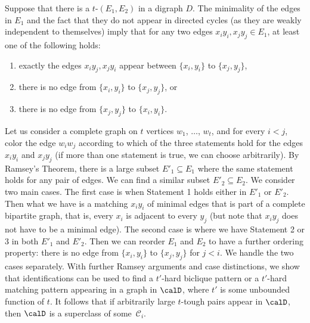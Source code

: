  Suppose that there is a $t$-\toughpair $(E_1,E_2)$ in a digraph $D$.  The minimality of the edges in $E_1$ and the fact that they do not appear in directed cycles (as they are weakly independent to themselves) imply that for any two edges $x_iy_i, x_jy_j\in E_1$, at least one of the following holds:
 \begin{enumerate}
   \item exactly the edges $x_iy_j, x_jy_i$ appear between $\{x_i,y_i\}$ to $\{x_j,y_j\}$,
   \item there is no edge from $\{x_i,y_i\}$ to $\{x_j,y_j\}$, or
   \item there is no edge from $\{x_j,y_j\}$ to $\{x_i,y_i\}$.
   \end{enumerate}
   Let us consider a complete graph on $t$ vertices $w_1$, $\dots$, $w_t$, and for every $i<j$, color the edge $w_iw_j$ according to which of the three statements hold for the edges $x_iy_i$ and $x_jy_j$ (if more than one statement is true, we can choose arbitrarily). By Ramsey's Theorem, there is a large subset $E'_1\subseteq E_1$ where the same statement holds for any pair of edges. We can find a similar subset $E'_2\subseteq E_2$. We consider two main cases. The first case is when Statement 1 holds either in $E'_1$ or $E'_2$. Then what we have is a matching $x_iy_i$ of minimal edges that is part of a complete bipartite graph, that is, every $x_i$ is adjacent to every $y_j$ (but note that $x_iy_j$ does not have to be a minimal edge). The second case is where we have Statement 2 or 3 in both $E'_1$ and $E'_2$. Then we can reorder $E_1$ and $E_2$ to have a further ordering property: there is no edge from $\{x_i,y_i\}$ to $\{x_j,y_j\}$ for $j<i$. We handle the two cases separately. With further Ramsey arguments and case distinctions, we show that identifications can be used to find a $t'$-hard biclique pattern or a $t'$-hard matching pattern appearing in a graph in $\calD$, where $t'$ is some unbounded function of $t$. It follows that if arbitrarily large $t$-tough pairs appear in $\calD$, then $\calD$ is a superclass of some~$\mathcal{C}_i$.

